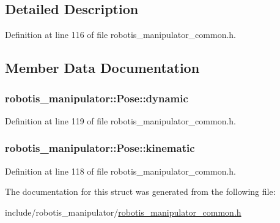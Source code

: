 \subsection{Detailed Description}


Definition at line 116 of file robotis\+\_\+manipulator\+\_\+common.\+h.



\subsection{Member Data Documentation}
\subsubsection[{\texorpdfstring{dynamic}{dynamic}}]{ robotis\+\_\+manipulator\+::\+Pose\+::dynamic}\hypertarget{structrobotis__manipulator_1_1_pose_a8accf10d21933e07ade2728fcccf4ae6}{}\label{structrobotis__manipulator_1_1_pose_a8accf10d21933e07ade2728fcccf4ae6}


Definition at line 119 of file robotis\+\_\+manipulator\+\_\+common.\+h.

\subsubsection[{\texorpdfstring{kinematic}{kinematic}}]{ robotis\+\_\+manipulator\+::\+Pose\+::kinematic}\hypertarget{structrobotis__manipulator_1_1_pose_a7215a37d50e62643f1523d3fa40a36e9}{}\label{structrobotis__manipulator_1_1_pose_a7215a37d50e62643f1523d3fa40a36e9}


Definition at line 118 of file robotis\+\_\+manipulator\+\_\+common.\+h.



The documentation for this struct was generated from the following file\+:\begin{DoxyCompactItemize}
\item 
include/robotis\+\_\+manipulator/\hyperlink{robotis__manipulator__common_8h}{robotis\+\_\+manipulator\+\_\+common.\+h}\end{DoxyCompactItemize}
